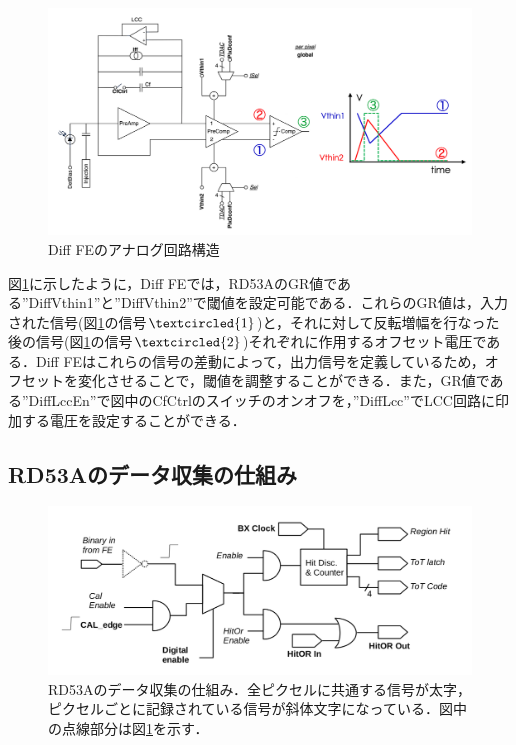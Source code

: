 \begin{figure}[h]
\centering
\includegraphics[width=15cm]{./figure/RD53A_DiffFE.png}
\caption{Diff FEのアナログ回路構造\cite{Garcia-Sciveres:2287593}}
\label{fig:DiffFE}
\end{figure}

図\ref{fig:DiffFE}に示したように，Diff FEでは，RD53AのGR値である''DiffVthin1''と''DiffVthin2''で閾値を設定可能である．これらのGR値は，入力された信号(図\ref{fig:DiffFE}の信号$\textcircled{\scriptsize1}$)と，それに対して反転増幅を行なった後の信号(図\ref{fig:DiffFE}の信号$\textcircled{\scriptsize2}$)それぞれに作用するオフセット電圧である．Diff FEはこれらの信号の差動によって，出力信号を定義しているため，オフセットを変化させることで，閾値を調整することができる．また，GR値である''DiffLccEn''で図中のCfCtrlのスイッチのオンオフを，''DiffLcc''でLCC回路に印加する電圧を設定することができる．

\subsection{RD53Aのデータ収集の仕組み}

\begin{figure}[h]
  \centering
  \includegraphics[width=13cm]{./figure/RD53Aproc.png}
  \caption{RD53Aのデータ収集の仕組み．全ピクセルに共通する信号が太字，ピクセルごとに記録されている信号が斜体文字になっている．図中の点線部分は図\ref{fig:DiffFE}を示す．\cite{Garcia-Sciveres:2287593}}
  \label{fig:RD53Aproc}
\end{figure}

